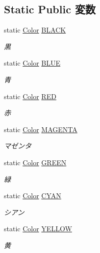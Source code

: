 \subsection*{Static Public 変数}
\begin{DoxyCompactItemize}
\item 
static \hyperlink{struct_color}{Color} \hyperlink{struct_color_a6f7dc225ef0b3dde655cbf925cad882d}{B\-L\-A\-C\-K}
\begin{DoxyCompactList}\small\item\em 黒 \end{DoxyCompactList}\item 
static \hyperlink{struct_color}{Color} \hyperlink{struct_color_a5a1557101e389271fe14dceef583799a}{B\-L\-U\-E}
\begin{DoxyCompactList}\small\item\em 青 \end{DoxyCompactList}\item 
static \hyperlink{struct_color}{Color} \hyperlink{struct_color_abe0e77f1bd12cb0e98b4d5650009942c}{R\-E\-D}
\begin{DoxyCompactList}\small\item\em 赤 \end{DoxyCompactList}\item 
static \hyperlink{struct_color}{Color} \hyperlink{struct_color_a5db67dc17b725499d542d194cf1d475e}{M\-A\-G\-E\-N\-T\-A}
\begin{DoxyCompactList}\small\item\em マゼンタ \end{DoxyCompactList}\item 
static \hyperlink{struct_color}{Color} \hyperlink{struct_color_a5b9aafb544d41992e367b065e6595143}{G\-R\-E\-E\-N}
\begin{DoxyCompactList}\small\item\em 緑 \end{DoxyCompactList}\item 
static \hyperlink{struct_color}{Color} \hyperlink{struct_color_aac281bf6e998aeef6f7e7c0c7df8dc34}{C\-Y\-A\-N}
\begin{DoxyCompactList}\small\item\em シアン \end{DoxyCompactList}\item 
static \hyperlink{struct_color}{Color} \hyperlink{struct_color_ad7b2412aba74d8d4b5e6d6dc7627264d}{Y\-E\-L\-L\-O\-W}
\begin{DoxyCompactList}\small\item\em 黄 \end{DoxyCompactList}\item 

\end{DoxyCompactItemize}
